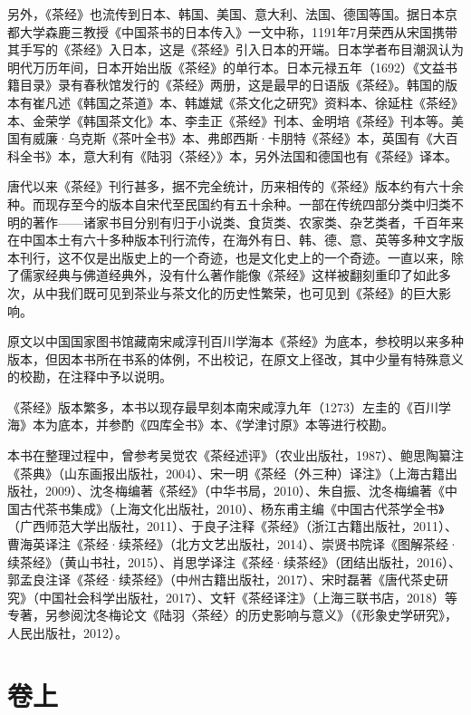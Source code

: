 \documentclass[12pt,UTF8]{ctexbook}
\begin{document}
另外，《茶经》也流传到日本、韩国、美国、意大利、法国、德国等国。据日本京都大学森鹿三教授《中国茶书的日本传入》一文中称，1191年7月荣西从宋国携带其手写的《茶经》入日本，这是《茶经》引入日本的开端。日本学者布目潮沨认为明代万历年间，日本开始出版《茶经》的单行本。日本元禄五年（1692）《文益书籍目录》录有春秋馆发行的《茶经》两册，这是最早的日语版《茶经》。韩国的版本有崔凡述《韩国之茶道》本、韩雄斌《茶文化之研究》资料本、徐延柱《茶经》本、金荣学《韩国茶文化》本、李圭正《茶经》刊本、金明培《茶经》刊本等。美国有威廉·乌克斯《茶叶全书》本、弗郎西斯·卡朋特《茶经》本，英国有《大百科全书》本，意大利有《陆羽〈茶经〉》本，另外法国和德国也有《茶经》译本。

唐代以来《茶经》刊行甚多，据不完全统计，历来相传的《茶经》版本约有六十余种。而现存至今的版本自宋代至民国约有五十余种。一部在传统四部分类中归类不明的著作——诸家书目分别有归于小说类、食货类、农家类、杂艺类者，千百年来在中国本土有六十多种版本刊行流传，在海外有日、韩、德、意、英等多种文字版本刊行，这不仅是出版史上的一个奇迹，也是文化史上的一个奇迹。一直以来，除了儒家经典与佛道经典外，没有什么著作能像《茶经》这样被翻刻重印了如此多次，从中我们既可见到茶业与茶文化的历史性繁荣，也可见到《茶经》的巨大影响。

原文以中国国家图书馆藏南宋咸淳刊百川学海本《茶经》为底本，参校明以来多种版本，但因本书所在书系的体例，不出校记，在原文上径改，其中少量有特殊意义的校勘，在注释中予以说明。

《茶经》版本繁多，本书以现存最早刻本南宋咸淳九年（1273）左圭的《百川学海》本为底本，并参酌《四库全书》本、《学津讨原》本等进行校勘。

本书在整理过程中，曾参考吴觉农《茶经述评》（农业出版社，1987）、鲍思陶纂注《茶典》（山东画报出版社，2004）、宋一明《茶经（外三种）译注》（上海古籍出版社，2009）、沈冬梅编著《茶经》（中华书局，2010）、朱自振、沈冬梅编著《中国古代茶书集成》（上海文化出版社，2010）、杨东甫主编《中国古代茶学全书》（广西师范大学出版社，2011）、于良子注释《茶经》（浙江古籍出版社，2011）、曹海英译注《茶经·续茶经》（北方文艺出版社，2014）、崇贤书院译《图解茶经·续茶经》（黄山书社，2015）、肖思学译注《茶经·续茶经》（团结出版社，2016）、郭孟良注译《茶经·续茶经》（中州古籍出版社，2017）、宋时磊著《唐代茶史研究》（中国社会科学出版社，2017）、文轩《茶经译注》（上海三联书店，2018）等专著，另参阅沈冬梅论文《陆羽〈茶经〉的历史影响与意义》（《形象史学研究》，人民出版社，2012）。

\mainmatter

\part{卷上}
\end{document}
